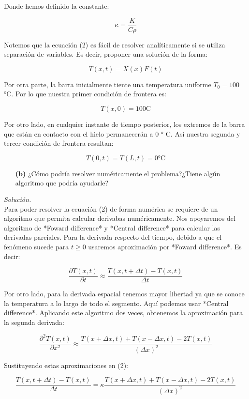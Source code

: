 \documentclass[11pt]{article}
\begin{document}
	 Donde hemos definido la constante:
	 
	 $$\kappa = \frac{K}{C \rho}$$
	 
	 Notemos que la ecuación (2) es fácil de resolver analíticamente si se utiliza separación de variables. Es decir, proponer una solución de la forma:
	 
	 $$T(x,t) = X(x)F(t)$$
	 
	 Por otra parte, la barra inicialmente tiente una temperatura uniforme  $T_0 =100$ °C. Por lo que nuestra primer condición de frontera es:
	 
	 $$T(x ,0) = 100 \text{C}$$
	 
	 Por otro lado, en  cualquier instante de tiempo posterior, los extremos de la barra que están en contacto con el hielo permanecerán a 0 ° C. Así nuestra segunda y tercer condición de frontera resultan:
	 
	 $$T(0 ,t) = T (L,t) = 0 °\text{C}$$

\begin{enumerate}
	\item [\textbf{(b)}] ¿Cómo podría resolver numéricamente el problema?¿Tiene algún algoritmo que podría ayudarle?
\end{enumerate}
\textit{Solución.}\\
	Para poder resolver la ecuación (2) de forma numérica se requiere de un algoritmo que permita calcular derivabas numéricamente. Nos apoyaremos del algoritmo de *Foward difference* y *Central difference* para calcular las derivadas parciales.  
	Para la derivada respecto del tiempo, debido a que el fenómeno sucede para $t\geq 0$ usaremos aproximación por *Foward difference*. Es decir:
	
	$$\frac{\partial T(x,t)}{\partial t} \approx \frac{T(x, t + \Delta t) - T(x,t)}{\Delta t}$$
	
	Por otro lado, para la derivada espacial tenemos mayor libertad ya que se conoce la temperatura a lo largo de todo el segmento. Aquí podemos usar *Central difference*. Aplicando este algoritmo dos veces, obtenemos la aproximación para la segunda derivada:
	
	$$\frac{\partial^2 T(x,t)}{\partial x^2} \approx \frac{T(x +\Delta x , t) + T(x - \Delta x,t) - 2T(x,t)}{(\Delta x)^2}$$
	
	Sustituyendo estas aproximaciones en (2):
	
	$$ \frac{T(x, t + \Delta t) - T(x,t)}{\Delta t} = \kappa  \frac{T(x +\Delta x , t) + T(x - \Delta x,t) - 2T(x,t)}{(\Delta x)^2}$$
	
\end{document}
